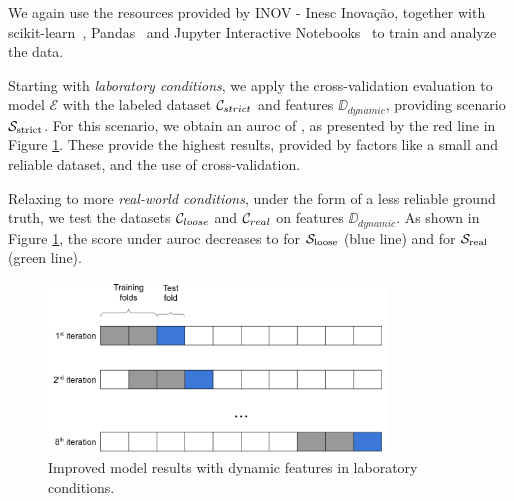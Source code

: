 We again use the resources provided by INOV - Inesc Inovação, together with scikit-learn~\cite{tool:sklearn}, Pandas~\cite{tool:pandas} and Jupyter Interactive Notebooks~\cite{tool:jupyter} to train and analyze the data.

\medskip

Starting with \textit{laboratory conditions}, we apply the cross-validation evaluation to model $\mathcal{E}$ with the labeled dataset $\mathcal{C}_{strict}$ and features $\DD_{dynamic}$, providing scenario $\mathcal{S}_{\mathrm{strict}}$.
For this scenario, we obtain an \gls{auroc} of , as presented by the red line in Figure \ref{fig:improved_xval}.
These provide the highest results, provided by factors like a small and reliable dataset, and the use of cross-validation.

Relaxing to more \textit{real-world conditions}, under the form of a less reliable ground truth, we test the datasets $\mathcal{C}_{loose}$ and $\mathcal{C}_{real}$ on features $\DD_{dynamic}$.
As shown in Figure \ref{fig:improved_xval}, the score under \gls{auroc} decreases to  for $\mathcal{S}_{\mathrm{loose}}$ (blue line) and  for $\mathcal{S}_{\mathrm{real}}$ (green line).

\begin{figure}[!h]
	\centering
	\includegraphics[width=0.8\textwidth]{Figures/dia_slidingwindow.png}
	\caption{Improved model results with dynamic features in laboratory conditions.}
	\label{fig:improved_xval}
\end{figure}


